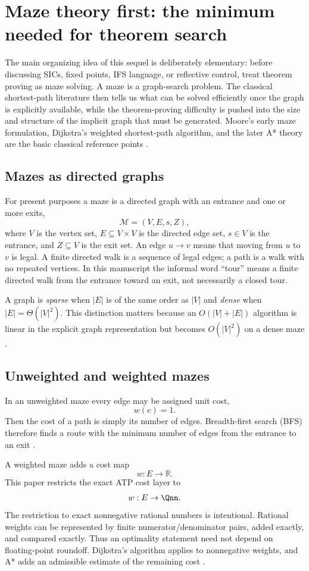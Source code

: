 \section{Maze theory first: the minimum needed for theorem search}
The main organizing idea of this sequel is deliberately elementary: before discussing SICs, fixed points, IFS language, or reflective control, treat theorem proving as maze solving. A maze is a graph-search problem. The classical shortest-path literature then tells us what can be solved efficiently once the graph is explicitly available, while the theorem-proving difficulty is pushed into the size and structure of the implicit graph that must be generated. Moore's early maze formulation, Dijkstra's weighted shortest-path algorithm, and the later A* theory are the basic classical reference points \cite{moore,dijkstra,astar,clrs}.

\subsection{Mazes as directed graphs}
For present purposes a maze is a directed graph with an entrance and one or more exits,
\[
\mathcal M=(V,E,s,Z),
\]
where $V$ is the vertex set, $E\subseteq V\times V$ is the directed edge set, $s\in V$ is the entrance, and $Z\subseteq V$ is the exit set. An edge $u\to v$ means that moving from $u$ to $v$ is legal. A finite directed walk is a sequence of legal edges; a path is a walk with no repeated vertices. In this manuscript the informal word ``tour'' means a finite directed walk from the entrance toward an exit, not necessarily a closed tour.

A graph is \emph{sparse} when $|E|$ is of the same order as $|V|$ and \emph{dense} when $|E|=\Theta(|V|^2)$. This distinction matters because an $O(|V|+|E|)$ algorithm is linear in the explicit graph representation but becomes $O(|V|^2)$ on a dense maze \cite{clrs}.

\subsection{Unweighted and weighted mazes}
In an unweighted maze every edge may be assigned unit cost,
\[
w(e)=1.
\]
Then the cost of a path is simply its number of edges. Breadth-first search (BFS) therefore finds a route with the minimum number of edges from the entrance to an exit \cite{moore,clrs}.

A weighted maze adds a cost map
\[
w:E\to\mathbb R.
\]
This paper restricts the exact ATP cost layer to
\[
w:E\to\Qnn.
\]
The restriction to exact nonnegative rational numbers is intentional. Rational weights can be represented by finite numerator/denominator pairs, added exactly, and compared exactly. Thus an optimality statement need not depend on floating-point roundoff. Dijkstra's algorithm applies to nonnegative weights, and A* adds an admissible estimate of the remaining cost \cite{dijkstra,astar,clrs}.

